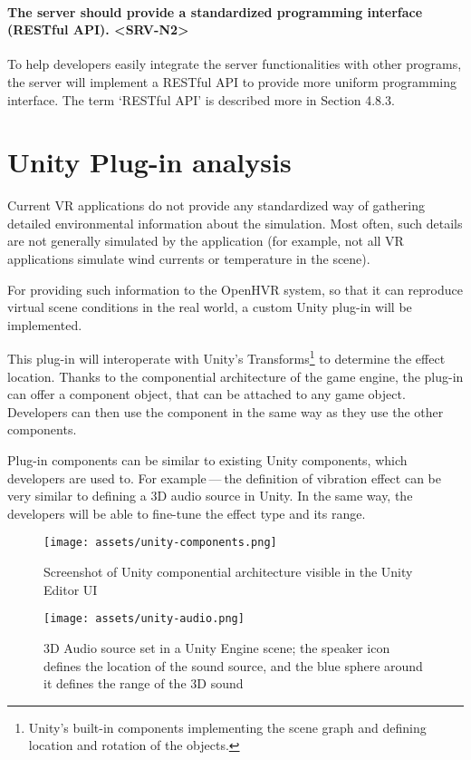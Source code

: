 \paragraph*{The server should provide a standardized programming interface (RESTful API). <SRV-N2>}
\label{srv-n2}
To help developers easily integrate the server functionalities with other 
programs, the server will implement a RESTful API to provide more uniform
programming interface. The term `RESTful API' is described more in
Section 4.8.3.


\section{Unity Plug-in analysis}\label{analysis:plugin}

Current VR applications do not provide any standardized way
of gathering detailed environmental information about the simulation.
Most often, such details are not generally simulated by the application
(for example, not all VR applications simulate wind currents or
temperature in the scene).

For providing such information to the OpenHVR system, so that it can
reproduce virtual scene conditions in the real world, a custom Unity plug-in
will be implemented.

This plug-in will interoperate with Unity’s Transforms\footnote{Unity’s built-in components implementing the scene graph and defining location and rotation of the objects.}
to determine the effect location. Thanks to the
componential architecture of the game engine, the plug-in can offer
a component object, that can be attached to any game object.
Developers can then use the component in the same way as they use the other
components.

Plug-in components can be similar to existing Unity components, which
developers are used to. For example — the definition of vibration effect can be
very similar to defining a 3D audio source in Unity. In the same way, 
the developers will be able to fine-tune the effect type and its range.

\begin{figure}[H]{}
  \centering\texttt{[image: assets/unity-components.png]}
  \caption{Screenshot of Unity componential architecture visible in the Unity Editor UI}
\end{figure}

\begin{figure}[H]{}
  \centering\texttt{[image: assets/unity-audio.png]}
  \caption{3D Audio source set in a Unity Engine scene; the speaker icon defines 
  the location of the sound source, and the blue sphere around it defines the 
  range of the 3D sound}
  \end{figure}

